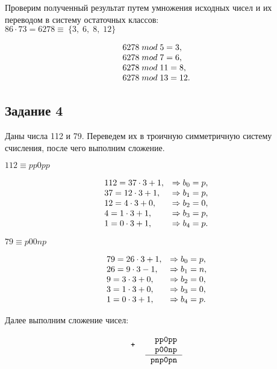 \documentclass[a4paper,14pt]{extarticle}
\begin{document}
	Проверим полученный результат путем умножения исходных чисел и их переводом в систему остаточных классов:\\
	$86\cdot73=6278 \equiv\ \{3,\;6,\;8,\;12\}$
	
	\[
	\begin{array}[c]{l}
		6278\;mod\;5 = 3,\\
		6278\;mod\;7 = 6,\\
		6278\;mod\;11 = 8,\\
		6278\;mod\;13 = 12.\\
	\end{array}
	\]
	
	\subsection*{Задание 4}
	
	Даны числа 112 и 79. Переведем их в троичную симметричную систему счисления, после чего выполним сложение.
	
	$112 \equiv pp0pp$
	
	\[
	\begin{array}[c]{ll}
		112 = 37 \cdot 3 + 1, &\Rightarrow b_{0} = p,\\
		37 = 12 \cdot 3 + 1, &\Rightarrow b_{1} = p,\\
		12 = 4 \cdot 3 + 0, &\Rightarrow b_{2} = 0,\\
		4 = 1 \cdot 3 + 1, &\Rightarrow b_{3} = p,\\
		1 = 0 \cdot 3 + 1, &\Rightarrow b_{4} = p.
	\end{array}
	\]
	
	\pagebreak
	
	$79 \equiv p00np$
	
	\[
	\begin{array}[c]{ll}
		79 = 26 \cdot 3 + 1, &\Rightarrow b_{0} = p,\\
		26 = 9 \cdot 3 - 1, &\Rightarrow b_{1} = n,\\
		9 = 3 \cdot 3 + 0, &\Rightarrow b_{2} = 0,\\
		3 = 1 \cdot 3 + 0, &\Rightarrow b_{3} = 0,\\
		1 = 0 \cdot 3 + 1, &\Rightarrow b_{4} = p.
	\end{array}
	\]
	
	Далее выполним сложение чисел:
	
	\[
	\begin{tabular}{{c}{c}}
		\texttt{+} &
		\begin{tabular}{c}
			\texttt{~pp0pp}\\
			\texttt{~p00np}\\
			\hline
		\end{tabular}\\
		& \texttt{pnp0pn}
	\end{tabular}
	\]
	
\end{document}
